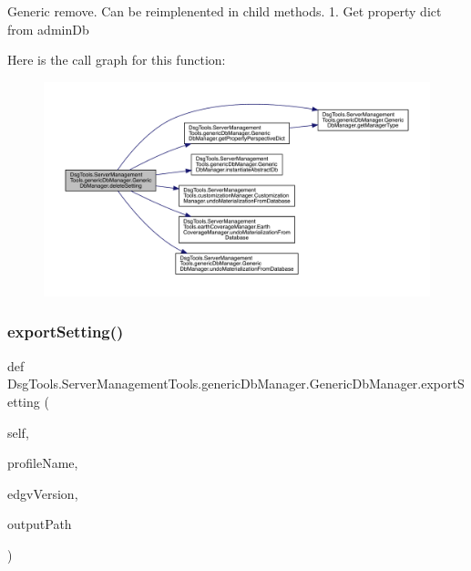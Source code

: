 \begin{DoxyVerb}Generic remove. Can be reimplenented in child methods.
1. Get property dict from adminDb 
\end{DoxyVerb}
 Here is the call graph for this function\+:
\nopagebreak
\begin{figure}[H]
\begin{center}
\leavevmode
\includegraphics[width=350pt]{class_dsg_tools_1_1_server_management_tools_1_1generic_db_manager_1_1_generic_db_manager_a3154565227241e71d7a8763f978aa7a4_cgraph}
\end{center}
\end{figure}
\mbox{\label{class_dsg_tools_1_1_server_management_tools_1_1generic_db_manager_1_1_generic_db_manager_a7f0414ff8fbbea9649608f6093f8fe5a}} 
\subsubsection{\texorpdfstring{export\+Setting()}{exportSetting()}}
{\footnotesize\ttfamily def Dsg\+Tools.\+Server\+Management\+Tools.\+generic\+Db\+Manager.\+Generic\+Db\+Manager.\+export\+Setting (\begin{DoxyParamCaption}\item[{}]{self,  }\item[{}]{profile\+Name,  }\item[{}]{edgv\+Version,  }\item[{}]{output\+Path }\end{DoxyParamCaption})}

